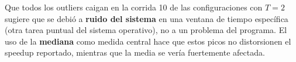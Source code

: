 Que todos los outliers caigan en la corrida 10 de las configuraciones con $T = 2$ sugiere que se debió a \textbf{ruido del sistema} en una ventana de tiempo específica (otra tarea puntual del sistema operativo), no a un problema del programa. El uso de la \textbf{mediana} como medida central hace que estos picos no distorsionen el speedup reportado, mientras que la media se vería fuertemente afectada.
